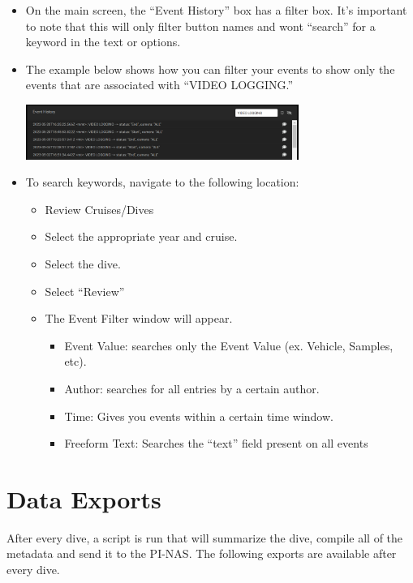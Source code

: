 \documentclass[
  letterpaper,
  DIV=11,
  numbers=noendperiod]{scrreprt}
\providecommand{\tightlist}{%
  \setlength{\itemsep}{0pt}\setlength{\parskip}{0pt}}\usepackage{longtable,booktabs,array}
\begin{document}
\begin{itemize}
\item
  On the main screen, the ``Event History'' box has a filter box. It's
  important to note that this will only filter button names and wont
  ``search'' for a keyword in the text or options.
\item
  The example below shows how you can filter your events to show only
  the events that are associated with ``VIDEO LOGGING.''

  \includegraphics[width=0.7\textwidth,height=\textheight]{images/image3.png}
\item
  To search keywords, navigate to the following location:

  \begin{itemize}
  \tightlist
  \item
    Review Cruises/Dives
  \item
    Select the appropriate year and cruise.
  \item
    Select the dive.
  \item
    Select ``Review''
  \item
    The Event Filter window will appear.

    \begin{itemize}
    \tightlist
    \item
      Event Value: searches only the Event Value (ex. Vehicle, Samples,
      etc).
    \item
      Author: searches for all entries by a certain author.
    \item
      Time: Gives you events within a certain time window.
    \item
      Freeform Text: Searches the ``text'' field present on all events
    \end{itemize}
  \end{itemize}
\end{itemize}

\hypertarget{data-exports}{%
\section{Data Exports}\label{data-exports}}

After every dive, a script is run that will summarize the dive, compile
all of the metadata and send it to the PI-NAS. The following exports are
available after every dive.
\end{document}
